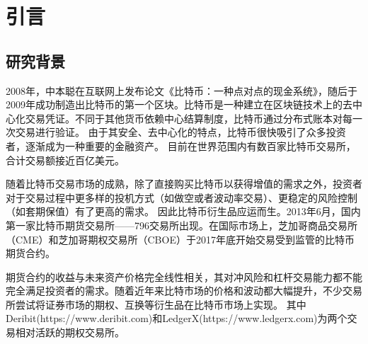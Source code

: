 \chapter{引言}
\section{研究背景}
\par{2008年，中本聪在互联网上发布论文《比特币：一种点对点的现金系统》\cite{Nakamoto_bitcoin:a}，随后于2009年成功制造出比特币的第一个区块。比特币是一种建立在区块链技术上的去中心化交易凭证。不同于其他货币依赖中心结算制度，比特币通过分布式账本对每一次交易进行验证。
由于其安全、去中心化的特点，比特币很快吸引了众多投资者，逐渐成为一种重要的金融资产。
目前在世界范围内有数百家比特币交易所，合计交易额接近百亿美元。
}
\par{随着比特币交易市场的成熟，除了直接购买比特币以获得增值的需求之外，投资者对于交易过程中更多样的投机方式（如做空或者波动率交易）、更稳定的风险控制（如套期保值）有了更高的需求。
因此比特币衍生品应运而生。2013年6月，国内第一家比特币期货交易所——796交易所出现。在国际市场上，芝加哥商品交易所（CME）和芝加哥期权交易所（CBOE）于2017年底开始交易受到监管的比特币期货合约。
}
\par{期货合约的收益与未来资产价格完全线性相关，其对冲风险和杠杆交易能力都不能完全满足投资者的需求。随着近年来比特市场的价格和波动都大幅提升，不少交易所尝试将证券市场的期权、互换等衍生品在比特币市场上实现。
其中Deribit(https://www.deribit.com)和LedgerX(https://www.ledgerx.com)为两个交易相对活跃的期权交易所。}
